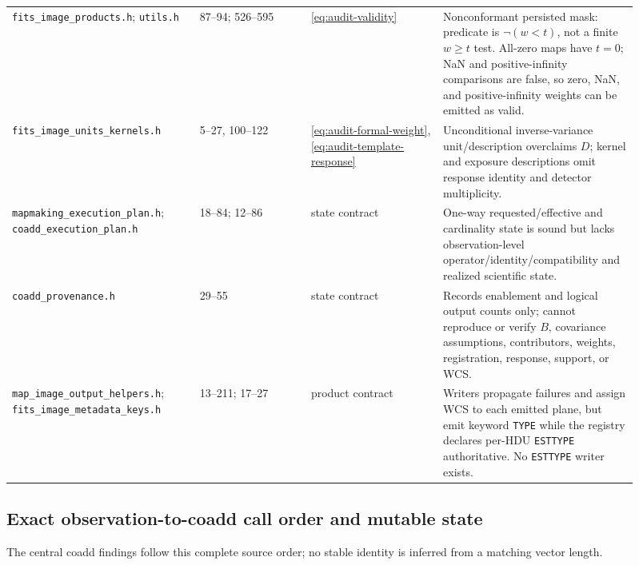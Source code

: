 \documentclass[11pt]{article}
\newcommand{\code}[1]{\nolinkurl{#1}}
\begin{document}
\begin{longtable}{L{0.27\linewidth}L{0.16\linewidth}L{0.19\linewidth}L{0.29\linewidth}}
\code{fits_image_products.h}; \code{utils.h} & 87--94; 526--595 &
\eqref{eq:audit-validity} & Nonconformant persisted mask: predicate is
\(\neg(w<t)\), not a finite \(w\ge t\) test.  All-zero maps have \(t=0\);
NaN and positive-infinity comparisons are false, so zero, NaN, and
positive-infinity weights can be emitted as valid.\\
\code{fits_image_units_kernels.h} & 5--27, 100--122 &
\eqref{eq:audit-formal-weight}, \eqref{eq:audit-template-response} & Unconditional
inverse-variance unit/description overclaims \(D\); kernel and exposure
descriptions omit response identity and detector multiplicity.\\
\code{mapmaking_execution_plan.h};
\code{coadd_execution_plan.h} & 18--84; 12--86 & state contract & One-way
requested/effective and cardinality state is sound but lacks observation-level
operator/identity/compatibility and realized scientific state.\\
\code{coadd_provenance.h} & 29--55 & state contract & Records enablement and
logical output counts only; cannot reproduce or verify \(B\), covariance
assumptions, contributors, weights, registration, response, support, or WCS.\\
\code{map_image_output_helpers.h};
\code{fits_image_metadata_keys.h} & 13--211; 17--27 & product contract & Writers
propagate failures and assign WCS to each emitted plane, but emit keyword
\code{TYPE} while the registry declares per-HDU \code{ESTTYPE} authoritative.
No \code{ESTTYPE} writer exists.\\
\bottomrule
\end{longtable}

\subsection{Exact observation-to-coadd call order and mutable state}

The central coadd findings follow this complete source order; no stable identity
is inferred from a matching vector length.
\end{document}

